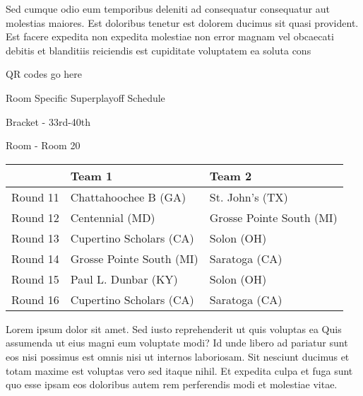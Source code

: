 \documentclass{article}%
\begin{document}
\newline%
    Sed cumque odio eum temporibus deleniti ad consequatur consequatur aut molestias maiores. Est doloribus tenetur est dolorem ducimus sit quasi provident. Est facere expedita non expedita molestiae non error magnam vel obcaecati debitis et blanditiis reiciendis est cupiditate voluptatem ea soluta cons%
\vspace*{140pt}%
\begin{center}%
\begin{Huge}%
QR codes go here%
\end{Huge}%
\end{center}%
\newpage%
\begin{center}%
\begin{Huge}%
Room Specific Superplayoff Schedule%
\end{Huge}%
\vspace*{8pt}%
\linebreak%
\begin{Large}%
Bracket {-} 33rd{-}40th%
\end{Large}%
\vspace*{8pt}%
\linebreak%
\vspace*{8pt}%
\begin{Large}%
Room {-} Room 20%
\end{Large}%
\end{center}%
%
\begin{tabularx}{\textwidth}{|c|Y|Y|}%
\hline%
&Team 1&Team 2\\%
\hline%
Round 11&Chattahoochee B (GA)&St. John's (TX)\\%
Round 12&Centennial (MD)&Grosse Pointe South (MI)\\%
Round 13&Cupertino Scholars (CA)&Solon (OH)\\%
Round 14&Grosse Pointe South (MI)&Saratoga (CA)\\%
Round 15&Paul L. Dunbar (KY)&Solon (OH)\\%
Round 16&Cupertino Scholars (CA)&Saratoga (CA)\\%
\hline%
\end{tabularx}%
\vspace*{8pt}%
\newline%
    Lorem ipsum dolor sit amet. Sed iusto reprehenderit ut quis voluptas ea Quis assumenda ut eius magni eum voluptate modi? Id unde libero ad pariatur sunt eos nisi possimus est omnis nisi ut internos laboriosam. Sit nesciunt ducimus et totam maxime est voluptas vero sed itaque nihil. Et expedita culpa et fuga sunt quo esse ipsam eos doloribus autem rem perferendis modi et molestiae vitae.\newline%
\end{document}
